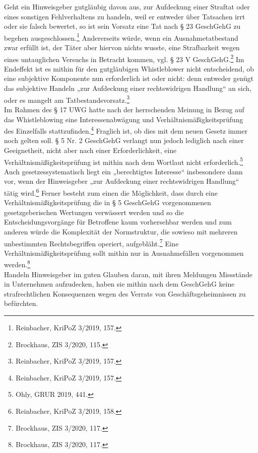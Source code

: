 Geht ein Hinweisgeber gutgläubig davon aus, zur Aufdeckung einer Straftat oder eines sonstigen Fehlverhaltens zu handeln, weil er entweder über Tatsachen irrt oder sie falsch bewertet, so ist sein Vorsatz eine Tat nach § 23 GeschGehG zu begehen ausgeschlossen.\footnote{Reinbacher, KriPoZ 3/2019, 157.}
Andererseits würde, wenn ein Ausnahmetatbestand zwar erfüllt ist, der Täter aber hiervon nichts wusste, eine Strafbarkeit wegen eines untauglichen Versuchs in Betracht kommen, vgl. § 23 V GeschGehG.\footnote{Brockhaus, ZIS 3/2020, 115.}
Im Endeffekt ist es mithin für den gutgläubigen Whistleblower nicht entscheidend, ob eine subjektive Komponente nun erforderlich ist oder nicht: denn entweder genügt das subjektive Handeln „zur Aufdeckung einer rechtswidrigen Handlung“ an sich, oder es mangelt am Tatbestandsvorsatz.\footnote{Reinbacher, KriPoZ 3/2019, 157.}\\
Im Rahmen des § 17 UWG hatte nach der herrschenden Meinung in Bezug auf das Whistleblowing eine Interessenabwägung und Verhältnismäßigkeitsprüfung des Einzelfalls stattzufinden.\footnote{Reinbacher, KriPoZ 3/2019, 157.}
Fraglich ist, ob dies mit dem neuen Gesetz immer noch gelten soll.
§ 5 Nr. 2 GeschGehG verlangt nun jedoch lediglich nach einer Geeignetheit, nicht aber nach einer Erforderlichkeit, eine Verhältnismäßigkeitsprüfung ist mithin nach dem Wortlaut nicht erforderlich.\footnote{Ohly, GRUR 2019, 441.}
Auch gesetzessystematisch liegt ein „berechtigtes Interesse“ insbesondere dann vor, wenn der Hinweisgeber „zur Aufdeckung einer rechtswidrigen Handlung“ tätig wird.\footnote{Reinbacher, KriPoZ 3/2019, 158.}
Ferner besteht zum einen die Möglichkeit, dass durch eine Verhältnismäßigkeitsprüfung die in § 5 GeschGehG vorgenommenen gesetzgeberischen Wertungen verwässert werden und so die Entscheidungsvorgänge für Betroffene kaum vorhersehbar werden und zum anderen würde die Komplexität der Normstruktur, die sowieso mit mehreren unbestimmten Rechtsbegriffen operiert, aufgebläht.\footnote{Brockhaus, ZIS 3/2020, 117.}
Eine Verhältnismäßigkeitsprüfung sollt mithin nur in Ausnahmefällen vorgenommen werden.\footnote{Brockhaus, ZIS 3/2020, 117.}\\
Handeln Hinweisgeber im guten Glauben daran, mit ihren Meldungen Missstände in Unternehmen aufzudecken, haben sie mithin nach dem GeschGehG keine strafrechtlichen Konsequenzen wegen des Verrats von Geschäftsgeheimnissen zu befürchten.